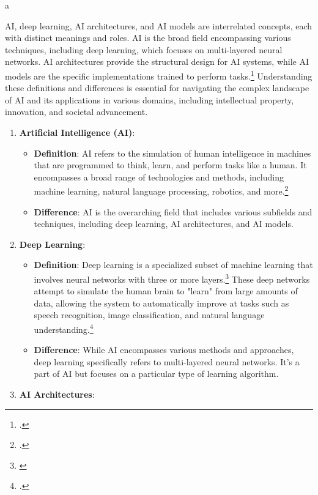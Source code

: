 a\documentclass{article}[10pt]
\begin{document}
AI, deep learning, AI architectures, and AI models are interrelated concepts, each with distinct meanings and roles. 
AI is the broad field encompassing various techniques, including deep learning, which focuses on multi-layered neural networks. 
AI architectures provide the structural design for AI systems, while AI models are the specific implementations trained to perform tasks.\footnote{
    \cite{goodfellow2016deep}.}
Understanding these definitions and differences is essential for navigating the complex landscape of AI and its applications in various domains, including intellectual property, innovation, and societal advancement.

\begin{enumerate}
	\item \textbf{Artificial Intelligence (AI)}:
	\begin{itemize}
		\item \textbf{Definition}: 
        AI refers to the simulation of human intelligence in machines that are programmed to think, learn, and perform tasks like a human. 
        It encompasses a broad range of technologies and methods, including machine learning, natural language processing, robotics, and more.\footnote{
            \cite{russell2010artificial}.}
		\item \textbf{Difference}: 
        AI is the overarching field that includes various subfields and techniques, including deep learning, AI architectures, and AI models.
	\end{itemize}
	\item \textbf{Deep Learning}:
	\begin{itemize}
		\item \textbf{Definition}: 
        Deep learning is a specialized subset of machine learning that involves neural networks with three or more layers.\footnote{
            \cite{lecun2015deep}}
        These deep networks attempt to simulate the human brain to "learn" from large amounts of data, allowing the system to automatically improve at tasks such as speech recognition, image classification, and natural language understanding.\footnote{
            \cite{krizhevsky2012imagenet}.}
		\item \textbf{Difference}: 
        While AI encompasses various methods and approaches, deep learning specifically refers to multi-layered neural networks. 
        It's a part of AI but focuses on a particular type of learning algorithm.
	\end{itemize}
	\item \textbf{AI Architectures}:

\end{enumerate}
\end{document}
